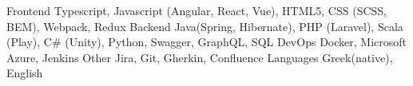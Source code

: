 

\begin{cvskills}
	\cvskill
		{Frontend} %
		{
			Typescript, Javascript (Angular, React, Vue), HTML5, CSS (SCSS, BEM), Webpack, Redux
		} %
	\cvskill
		{Backend} %
		{
			Java(Spring, Hibernate), PHP (Laravel), Scala (Play), C\# (Unity), Python, Swagger, GraphQL, SQL
		} %
	\cvskill
		{DevOps} %
		{Docker, Microsoft Azure, Jenkins} %
	\cvskill
		{Other} %
		{Jira, Git, Gherkin, Confluence} %
	\cvskill
		{Languages} %
		{Greek(native), English} %
\end{cvskills}
